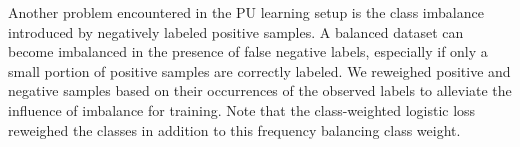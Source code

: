 
Another problem encountered in the PU learning setup is the class imbalance introduced by negatively labeled positive samples.
A balanced dataset can become imbalanced in the presence of false negative labels, especially if only a small portion of positive samples are correctly labeled.
We reweighed positive and negative samples based on their occurrences of the observed labels to alleviate the influence of imbalance for training.
Note that the class-weighted logistic loss reweighed the classes in addition to this frequency balancing class weight.
